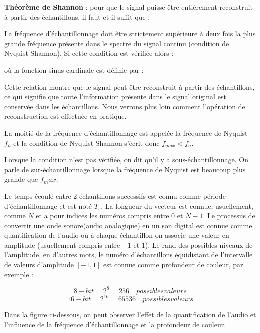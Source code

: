 \documentclass[conference,onecolumn]{IEEEtran}
\begin{document}
\textbf{Théorème de Shannon} : pour que le signal puisse être entièrement reconstruit à partir des échantillons, il faut et il suffit que : 

La fréquence d'échantillonnage doit être strictement supérieure à deux fois la plus grande fréquence présente dans le spectre du signal continu (condition de Nyquist-Shannon). Si cette condition est vérifiée alors : 

où la fonction sinus cardinale est définie par : 

Cette relation montre que le signal peut être reconstruit à partir des échantillons, ce qui signifie que toute l'information présente dans le signal original est conservée dans les échantillons. Nous verrons plus loin comment l'opération de reconstruction est effectuée en pratique. 

La moitié de la fréquence d'échantillonnage est appelée la fréquence de Nyquist $f_n$ et la condition de Nyquist-Shannon s'écrit donc $f_{max}<f_n$. 

Lorsque la condition n'est pas vérifiée, on dit qu'il y a sous-échantillonnage. On parle de sur-échantillonnage lorsque la fréquence de Nyquist est beaucoup plus grande que $f_max$. 

Le temps écoulé entre 2 échantillons successifs est connu comme période d’échantillonnage et est noté $T_s$. La longueur du vecteur est connue, usuellement, comme $N$ et a pour indices les numéros compris entre $0$ et $N-1$. Le processus de convertir une onde sonore(audio analogique) en un son digital est connue comme quantification de l’audio où à chaque échantillon on associe une valeur en amplitude (usuellement compris entre $-1$ et $1$). Le rand des possibles niveaux de l’amplitude, en d’autres mots,  le numéro d’échantillons équidistant de l’intervalle de valeurs d’amplitude $[-1, 1]$ est connue comme profondeur de couleur, par exemple :

\[8-bit = 2^8 = 256 \quad possibles valeurs\]
\[16-bit = 2^{16} = 65536 \quad possibles valeurs\]

Dans la figure ci-dessous, on peut observer l’effet de la quantification de l’audio et l’influence de la fréquence d’échantillonnage et la profondeur de couleur.
\end{document}
